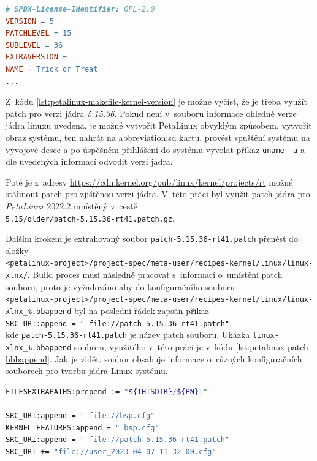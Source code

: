\documentclass[a4paper, twoside, 11pt]{article}
\begin{document}
				\begin{lstlisting}[language={make}, caption={Významná část Makefile souboru pro určení verze jádra PetaLinux systému.}, label= {lst:petalinux-makefile-kernel-version}]
# SPDX-License-Identifier: GPL-2.0
VERSION = 5
PATCHLEVEL = 15
SUBLEVEL = 36
EXTRAVERSION =
NAME = Trick or Treat
...\end{lstlisting}
				
				Z~kódu \ref{lst:petalinux-makefile-kernel-version} je možné vyčíst, že je třeba využít patch pro verzi jádra \textit{5.15.36}. Pokud není v~souboru informace ohledně verze jádra linuxu uvedena, je možné vytvořit PetaLinux obvyklým způsobem, vytvořit obraz systému, ten nahrát na \gls{abbreviation:sd} kartu, provést spuštění systému na vývojové desce a po úspěšném přihlášení do systému vyvolat příkaz \texttt{uname -a} a dle uvedených informací odvodit verzi jádra.\par
				Poté je z~adresy \href{https://cdn.kernel.org/pub/linux/kernel/projects/rt}{\textcolor{ctublue}{https://cdn.kernel.org/pub/linux/kernel/projects/rt}} možné stáhnout patch pro zjištěnou verzi jádra. V~této práci byl využit patch jádra pro \textit{PetaLinux} 2022.2 umístěný v~cestě\\\texttt{5.15/older/patch-5.15.36-rt41.patch.gz}.\par
				Dalším krokem je extrahovaný soubor \texttt{patch-5.15.36-rt41.patch} přenést do složky\\\texttt{<petalinux-project>/project-spec/meta-user/recipes-kernel/linux/linux-xlnx/}. Build proces musí následně pracovat s~informací o~umístění patch souboru, proto je vyžadováno aby do konfiguračního souboru\\\texttt{<petalinux-project>/project-spec/meta-user/recipes-kernel/linux/linux-xlnx\_\%.bbappend} byl na poslední řádek zapsán příkaz\\\texttt{SRC\_URI:append = " file://patch-5.15.36-rt41.patch"},\\kde \texttt{patch-5.15.36-rt41.patch} je název patch souboru. Ukázka \texttt{linux-xlnx\_\%.bbappend} souboru, využitého v~této práci je v~kódu \ref{lst:petalinux-patch-bbbappend}. Jak je vidět, soubor obsahuje informace o~různých konfiguračních souborech pro tvorbu jádra Linux systému.

				\begin{lstlisting}[language={sh}, caption={Ukázka konfiguračního souboru pro aplikování Linux patch souboru.}, label= {lst:petalinux-patch-bbbappend}]
FILESEXTRAPATHS:prepend := "${THISDIR}/${PN}:"

SRC_URI:append = " file://bsp.cfg"
KERNEL_FEATURES:append = " bsp.cfg"
SRC_URI:append = " file://patch-5.15.36-rt41.patch"
SRC_URI += "file://user_2023-04-07-11-32-00.cfg"\end{lstlisting}
\end{document}
